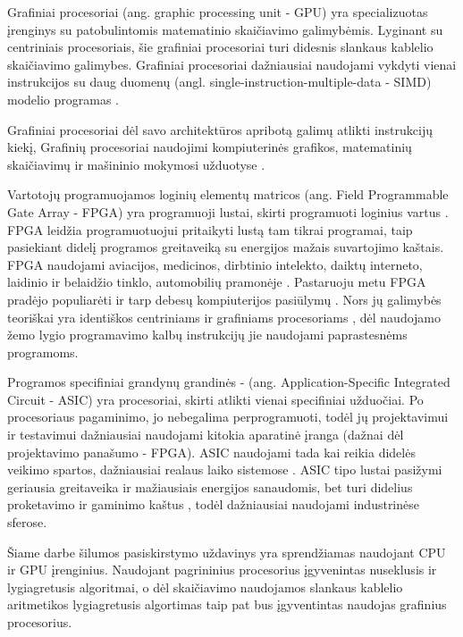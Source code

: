 \documentclass{VUMIFPSbakalaurinis}
\begin{document}
Grafiniai procesoriai (ang. graphic processing unit - GPU) yra specializuotas įrenginys su patobulintomis matematinio skaičiavimo galimybėmis.
Lyginant su centriniais procesoriais, šie grafiniai procesoriai turi didesnis slankaus kablelio skaičiavimo galimybes.
Grafiniai procesoriai dažniausiai naudojami vykdyti vienai instrukcijos su daug duomenų (angl. single-instruction-multiple-data - SIMD) modelio programas \cite{harish2007accelerating}.

Grafiniai procesoriai dėl savo architektūros apribotą galimų atlikti instrukcijų kiekį, 
Grafinių procesoriai naudojimi kompiuterinės grafikos, matematinių skaičiavimų ir mašininio mokymosi užduotyse \cite{root2016mapd}.



Vartotojų programuojamos loginių elementų matricos (ang. Field Programmable Gate Array - FPGA) yra programuoji lustai, skirti programuoti loginius vartus \cite{monmasson2007fpga}.
FPGA leidžia programuotuojui pritaikyti lustą tam tikrai programai, taip pasiekiant didelį programos greitaveiką su energijos mažais suvartojimo kaštais. 
FPGA naudojami aviacijos, medicinos, dirbtinio intelekto, daiktų interneto, laidinio ir belaidžio tinklo, automobilių pramonėje \cite{monmasson2007fpga, hill2017precision}. 
Pastaruoju metu FPGA pradėjo populiarėti ir tarp debesų kompiuterijos pasiūlymų \cite{skhiri2019fpga}.
Nors jų galimybės teoriškai yra identiškos centriniams ir grafiniams procesoriams \cite{vyazigin2021emulation}, dėl naudojamo žemo lygio programavimo kalbų instrukcijų jie naudojami paprastesnėms programoms.

Programos specifiniai grandynų grandinės - (ang. Application-Specific Integrated Circuit - ASIC) yra procesoriai, skirti atlikti vienai specifiniai užduočiai.
Po procesoriaus pagaminimo, jo nebegalima perprogramuoti, todėl jų projektavimui ir testavimui dažniausiai naudojami kitokia aparatinė įranga (dažnai dėl projektavimo panašumo - FPGA).
ASIC naudojami tada kai reikia didelės veikimo spartos, dažniausiai realaus laiko sistemose \cite{genovese2013asic}. 
ASIC tipo lustai pasižymi geriausia greitaveika ir mažiausiais energijos sanaudomis, bet turi didelius proketavimo ir gaminimo kaštus \cite{gayle1993cost}, todėl dažniausiai naudojami industrinėse sferose.

Šiame darbe šilumos pasiskirstymo uždavinys yra sprendžiamas naudojant CPU ir GPU įrenginius. 
Naudojant pagrininius procesorius įgyvenintas nuseklusis ir lygiagretusis algoritmai, o dėl skaičiavimo naudojamos slankaus kablelio aritmetikos lygiagretusis algortimas taip pat bus įgyventintas naudojas grafinius procesorius.     
\end{document}
